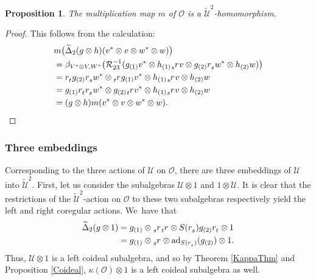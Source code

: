 \documentclass[11pt]{article}
\newtheorem{prop}[thm]{Proposition}
\theoremstyle{definition}
\newcommand{\OO}{\mathcal{O}}
\newcommand{\UU}{\mathcal{U}}
\newcommand{\ad}{\mathrm{ad}}
\begin{document}
\begin{prop}
The multiplication map $m$ of $\OO$ is a $\widetilde{\UU}^2$-homomorphism.
\end{prop}

\begin{proof}
This follows from the calculation:
\begin{align*}
&m\bigl(\widetilde{\Delta}_2(g\otimes h)(v^*\otimes v\otimes w^*\otimes w)\bigr)\\
&=\beta_{V^*\otimes V, W^*}\bigl(\mathcal{R}_{23}^{-1}(g_{(1)}v^*\otimes h_{(1)}\tensor[_s]{r}{} v\otimes g_{(2)}\tensor[]{r}{_s}w^*\otimes h_{(2)}w)\bigr)\\
&=\tensor[]{r}{_t}g_{(2)}\tensor[]{r}{_s}w^*\otimes \tensor[_t]{r}{} g_{(1)}v^*\otimes h_{(1)}\tensor[_s]{r}{}v\otimes h_{(2)}w\\
&=g_{(1)}\tensor[]{r}{_t}\tensor[]{r}{_s}w^*\otimes g_{(2)}\tensor[_t]{r}{}v^*\otimes h_{(1)}\tensor[_s]{r}{}v\otimes h_{(2)}w\\
&=(g\otimes h)m(v^*\otimes v\otimes w^*\otimes w).\qedhere
\end{align*}
\end{proof}

\subsubsection{Three embeddings}
Corresponding to the three actions of $\UU$ on $\OO$, there are three embeddings of $\UU$ into $\widetilde{\UU}^2$.
First, let us consider the subalgebras $\UU\otimes 1$ and $1\otimes\UU$.
It is clear that the restrictions of the $\widetilde{\UU}^2$-action on $\OO$ to these two subalgebras respectively yield the left and right coregular actions. We~have that\vspace*{-3pt}
\begin{equation}
\begin{aligned}
\widetilde{\Delta}_2(g\otimes 1)&=g_{(1)}\otimes \tensor[_s]{r}{}\tensor[_t]{r}{}\otimes S(\tensor[]{r}{_s})g_{(2)}\tensor[]{r}{_t}\otimes 1\\
&= g_{(1)}\otimes \tensor[_s]{r}{}\otimes \ad_{S(\tensor[]{r}{_s})} (g_{(2)})\otimes 1.
\end{aligned}
\label{SubCoproductL}
\end{equation}
Thus, $\UU\otimes 1$ is a left coideal subalgebra, and so by Theorem \ref{KappaThm} and Proposition \ref{Coideal}, $\kappa(\OO)\otimes 1$ is a left coideal subalgebra as well.
\end{document}

